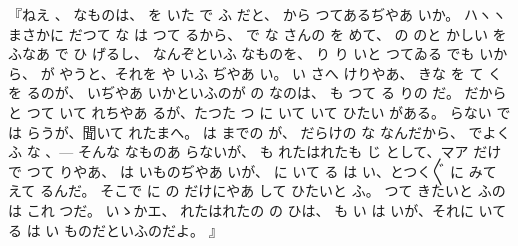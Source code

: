『ねえ
、
なものは、
を
いた
で
ふ
だと、
から
つてあるぢやあ
いか。
ハヽヽまさかに
だつて
な
は
つて
るから、
で
な
さんの
を
めて、
の
のと
かしい
を
ふなあ
で
ひ
げるし、
なんぞといふ
なものを、
り
り
いと
つてゐる
でも
いから、
が
やうと、それを
や
いふ
ぢやあ
い。
い
さへ
けりやあ、
きな
を
て
く
を
るのが、
いぢやあ
いかといふのが
の
なのは、
も
つて
る
りの
だ。
だから
と
つて
いて
れちやあ
るが、たつた
つ
に
いて
いて
ひたい
がある。
らない
では
らうが、聞いて
れたまへ。
は
までの
が、
だらけの
な
なんだから、
でよく
ふ
な
、--- そんな
なものあ
らないが、
も
れたはれたも
じ
として、マア
だけで
つて
りやあ、
は
いものぢやあ
いが、
に
いて
る
は
い、とつく〴〵
に
みて
えて
るんだ。
そこで
に
の
だけにやあ
して
ひたいと
ふ。
つて
きたいと
ふのは
これ
つだ。
いゝかエ、
れたはれたの
の
ひは、
も
い
は
いが、それに
いて
る
は
い
ものだといふのだよ。
』


